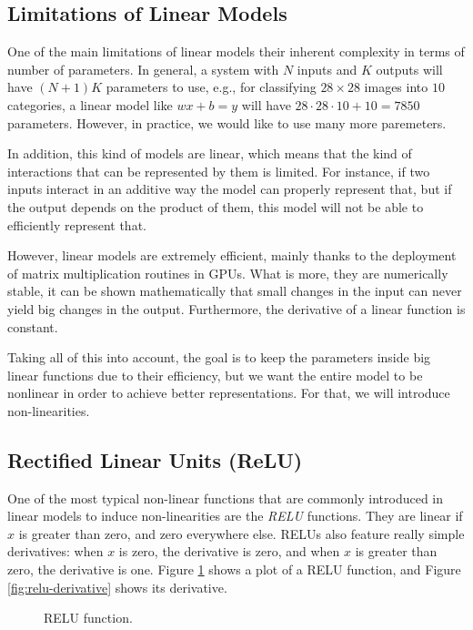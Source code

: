 \documentclass[english, 11pt]{article}
\begin{document}
	\subsection{Limitations of Linear Models}

	One of the main limitations of linear models their inherent complexity in terms of number of parameters. In general, a system with $N$ inputs and $K$ outputs will have $(N+1)K$ parameters to use, e.g., for classifying $28 \times 28$ images into $10$ categories, a linear model like $wx + b = y$ will have $28\cdot28\cdot10 + 10 = 7850$ parameters. However, in practice, we would like to use many more paremeters.

	In addition, this kind of models are linear, which means that the kind of interactions that can be represented by them is limited. For instance, if two inputs interact in an additive way the model can properly represent that, but if the output depends on the product of them, this model will not be able to efficiently represent that.

	However, linear models are extremely efficient, mainly thanks to the deployment of matrix multiplication routines in GPUs. What is more, they are numerically stable, it can be shown mathematically that small changes in the input can never yield big changes in the output. Furthermore, the derivative of a linear function is constant.

	Taking all of this into account, the goal is to keep the parameters inside big linear functions due to their efficiency, but we want the entire model to be nonlinear in order to achieve better representations. For that, we will introduce non-linearities.

	\subsection{Rectified Linear Units (ReLU)}

	One of the most typical non-linear functions that are commonly introduced in linear models to induce non-linearities are the \emph{\ac{RELU}} functions. They are linear if $x$ is greater than zero, and zero everywhere else. \acp{RELU} also feature really simple derivatives: when $x$ is zero, the derivative is zero, and when $x$ is greater than zero, the derivative is one. Figure \ref{fig:relu} shows a plot of a \ac{RELU} function, and Figure \ref{fig:relu-derivative} shows its derivative.

	\begin{figure}[!hbt]
		\centering
		\caption{\ac{RELU} function.}
		\label{fig:relu}
	\end{figure}
\end{document}
